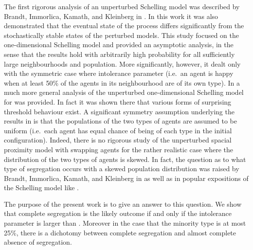 \documentclass[11pt]{article}
\theoremstyle{plain}
\numberwithin{equation}{subsection}
\begin{document}
The first rigorous analysis of an 
unperturbed Schelling model was described 
by  Brandt, Immorlica, Kamath, and Kleinberg
in \cite{brandt:an}. 
In this work it was also demonstrated that the eventual state of the 
process differs significantly from the stochastically stable states of the perturbed models.
This study focused on the one-dimensional Schelling model 
and provided an asymptotic analysis, in the sense that the results hold 
with arbitrarily high probability
for all sufficiently
large neighbourhoods and population.
More significantly, however, it dealt only with the symmetric case where
intolerance parameter   (i.e.\ an agent is happy when at least 50\% of the agents
in its neighbourhood are of its own type). 
 In  \cite{BELschel13}
a much more general analysis of the unperturbed one-dimensional Schelling model
for  was provided. In fact it was shown there that various forms of surprising threshold behaviour exist. 
A significant symmetry assumption underlying 
the results in \cite{brandt:an, BELschel13}
is that
the populations of the two types of agents are assumed to be uniform 
(i.e.\ each agent has equal chance of being of each type in the initial configuration). 
Indeed, there is no rigorous study of the unperturbed spacial proximity model with swapping agents
for the rather realistic  case where the distribution of the two types of agents is skewed.
In fact, the question as to what type of segregation occurs with a skewed population distribution
was raised by  Brandt, Immorlica, Kamath, and Kleinberg 
in \cite[Section 4]{brandt:an} as well as in popular expositions
of the Schelling model like \cite{Hayes}.

The purpose of the present work is to give an answer to this question.
We show that complete segregation is the likely outcome if and only if the intolerance
parameter is larger than . Moreover in the case that the minority type is at most 
25\%, there is a dichotomy between complete segregation and almost complete
absence of segregation.
\end{document}
